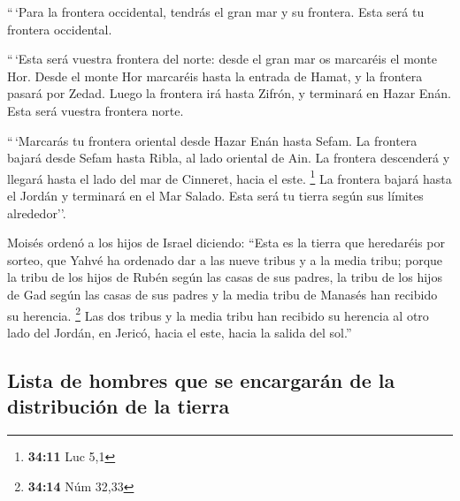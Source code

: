  ``\,`Para la frontera occidental, tendrás el gran mar y
su frontera. Esta será tu frontera occidental.

 ``\,`Esta será vuestra frontera del norte: desde el gran
mar os marcaréis el monte Hor.  Desde el monte Hor
marcaréis hasta la entrada de Hamat, y la frontera pasará por Zedad.
 Luego la frontera irá hasta Zifrón, y terminará en Hazar
Enán. Esta será vuestra frontera norte.

 ``\,`Marcarás tu frontera oriental desde Hazar Enán
hasta Sefam.  La frontera bajará desde Sefam hasta Ribla,
al lado oriental de Ain. La frontera descenderá y llegará hasta el lado
del mar de Cinneret, hacia el este. \footnote{\textbf{34:11} Luc 5,1}
 La frontera bajará hasta el Jordán y terminará en el Mar
Salado. Esta será tu tierra según sus límites alrededor''.

 Moisés ordenó a los hijos de Israel diciendo: ``Esta es
la tierra que heredaréis por sorteo, que Yahvé ha ordenado dar a las
nueve tribus y a la media tribu;  porque la tribu de los
hijos de Rubén según las casas de sus padres, la tribu de los hijos de
Gad según las casas de sus padres y la media tribu de Manasés han
recibido su herencia. \footnote{\textbf{34:14} Núm 32,33}
 Las dos tribus y la media tribu han recibido su herencia
al otro lado del Jordán, en Jericó, hacia el este, hacia la salida del
sol.''

\hypertarget{lista-de-hombres-que-se-encargaruxe1n-de-la-distribuciuxf3n-de-la-tierra}{%
\subsection{Lista de hombres que se encargarán de la distribución de la
tierra}\label{lista-de-hombres-que-se-encargaruxe1n-de-la-distribuciuxf3n-de-la-tierra}}


